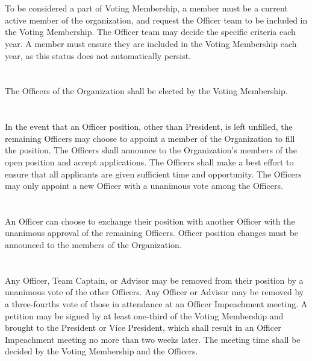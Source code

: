\documentclass[12pt]{cls/constitution}
\begin{document}
\section{}
To be considered a part of Voting Membership, a member must be a current active member of the organization, and request the Officer team to be included in the Voting Membership. The Officer team may decide the specific criteria each year. A member must ensure they are included in the Voting Membership each year, as this status does not automatically persist.

\section{}
The Officers of the Organization shall be elected by the Voting Membership.

\section{}
In the event that an Officer position, other than President, is left unfilled, the remaining Officers may choose to appoint a member of the Organization to fill the position. The Officers shall announce to the Organization's members of the open position and accept applications. The Officers shall make a best effort to ensure that all applicants are given sufficient time and opportunity. The Officers may only appoint a new Officer with a unanimous vote among the Officers.

\section{}
An Officer can choose to exchange their position with another Officer with the unanimous approval of the remaining Officers. Officer position changes must be announced to the members of the Organization.

\section{}
Any Officer, Team Captain, or Advisor may be removed from their position by a unanimous vote of the other Officers. Any Officer or Advisor may be removed by a three-fourths vote of those in attendance at an Officer Impeachment meeting. A petition may be signed by at least one-third of the Voting Membership and brought to the President or Vice President, which shall result in an Officer Impeachment meeting no more than two weeks later. The meeting time shall be decided by the Voting Membership and the Officers.
\end{document}
